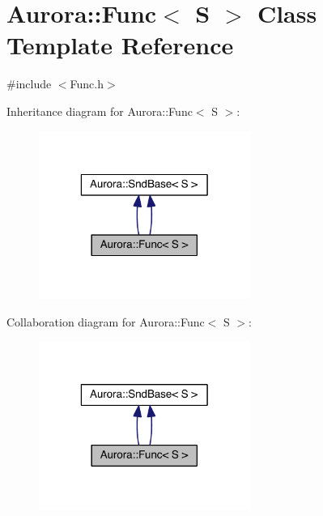 \hypertarget{class_aurora_1_1_func}{}\section{Aurora\+:\+:Func$<$ S $>$ Class Template Reference}
\label{class_aurora_1_1_func}


{\ttfamily \#include $<$Func.\+h$>$}



Inheritance diagram for Aurora\+:\+:Func$<$ S $>$\+:
\nopagebreak
\begin{figure}[H]
\begin{center}
\leavevmode
\includegraphics[width=196pt]{class_aurora_1_1_func__inherit__graph}
\end{center}
\end{figure}


Collaboration diagram for Aurora\+:\+:Func$<$ S $>$\+:
\nopagebreak
\begin{figure}[H]
\begin{center}
\leavevmode
\includegraphics[width=196pt]{class_aurora_1_1_func__coll__graph}
\end{center}
\end{figure}
